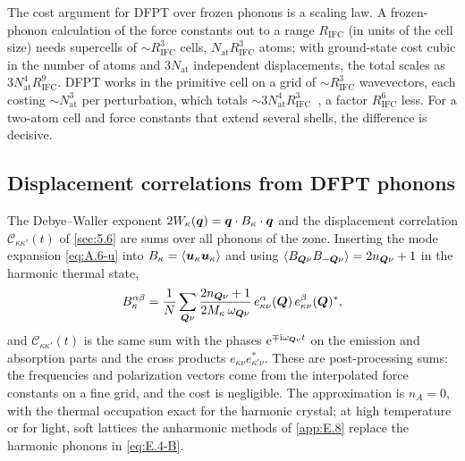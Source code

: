 The cost argument for DFPT over frozen phonons is a scaling law. A frozen-phonon calculation of the force constants out to a range $R_{\mathrm{IFC}}$ (in units of the cell size) needs supercells of $\sim R_{\mathrm{IFC}}^3$ cells, $N_{\mathrm{at}}R_{\mathrm{IFC}}^3$ atoms; with ground-state cost cubic in the number of atoms and $3N_{\mathrm{at}}$ independent displacements, the total scales as $3N_{\mathrm{at}}^4R_{\mathrm{IFC}}^9$. DFPT works in the primitive cell on a grid of $\sim R_{\mathrm{IFC}}^3$ wavevectors, each costing $\sim N_{\mathrm{at}}^3$ per perturbation, which totals $\sim 3N_{\mathrm{at}}^4R_{\mathrm{IFC}}^3$~\cite[Sect.~IV.B]{baroni2001phonons}, a factor $R_{\mathrm{IFC}}^6$ less. For a two-atom cell and force constants that extend several shells, the difference is decisive.

\subsection{Displacement correlations from DFPT phonons}

The Debye--Waller exponent $2W_\kappa(\bm{q}) = \bm{q}\cdot B_\kappa\cdot\bm{q}$ and the displacement correlation $\mathcal{C}_{\kappa\kappa'}(t)$ of \cref{sec:5.6} are sums over all phonons of the zone. Inserting the mode expansion \cref{eq:A.6-u} into $B_\kappa = \langle\bm{u}_\kappa\bm{u}_\kappa\rangle$ and using $\langle B_{\bm{Q}\nu}B_{-\bm{Q}\nu}\rangle = 2n_{\bm{Q}\nu} + 1$ in the harmonic thermal state,
\begin{equation}
  B^{\alpha\beta}_\kappa = \frac{1}{N}\sum_{\bm{Q}\nu}\frac{2n_{\bm{Q}\nu} + 1}{2M_\kappa\,\omega_{\bm{Q}\nu}}\,
  e^\alpha_{\kappa\nu}(\bm{Q})\,e^{\beta}_{\kappa\nu}(\bm{Q})^* ,
  \label{eq:E.4-B}
\end{equation}
and $\mathcal{C}_{\kappa\kappa'}(t)$ is the same sum with the phases $\mathrm{e}^{\mp\mathrm{i}\omega_{\bm{Q}\nu}t}$ on the emission and absorption parts and the cross products $e_{\kappa\nu}e^*_{\kappa'\nu}$. These are post-processing sums: the frequencies and polarization vectors come from the interpolated force constants on a fine grid, and the cost is negligible. The approximation is $n_A = 0$, with the thermal occupation exact for the harmonic crystal; at high temperature or for light, soft lattices the anharmonic methods of \cref{app:E.8} replace the harmonic phonons in \cref{eq:E.4-B}.

